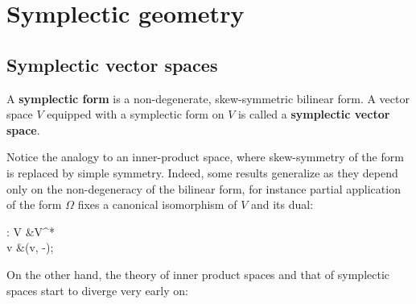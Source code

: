 \documentclass[main.tex]{subfiles}
\begin{document}
\chapter{Symplectic geometry}
\section{Symplectic vector spaces}
\begin{definition}
	A \textbf{symplectic form} is a non-degenerate, skew-symmetric bilinear form. A vector space $V$ equipped with a symplectic form on $V$ is called a \textbf{symplectic vector space}.
\end{definition}

Notice the analogy to an inner-product space, where skew-symmetry of the form is replaced by simple symmetry. Indeed, some results generalize as they depend only on the non-degeneracy of the bilinear form, for instance partial application of the form $\Omega$ fixes a canonical isomorphism of $V$ and its dual:
\begin{eqalign}
\label{eq:iso_induc_sym_form}
	\tilde\Omega : V &\longto V^*\\
	v &\longmapsto \Omega(v, -);
\end{eqalign}
On the other hand, the theory of inner product spaces and that of symplectic spaces start to diverge very early on:
\end{document}
